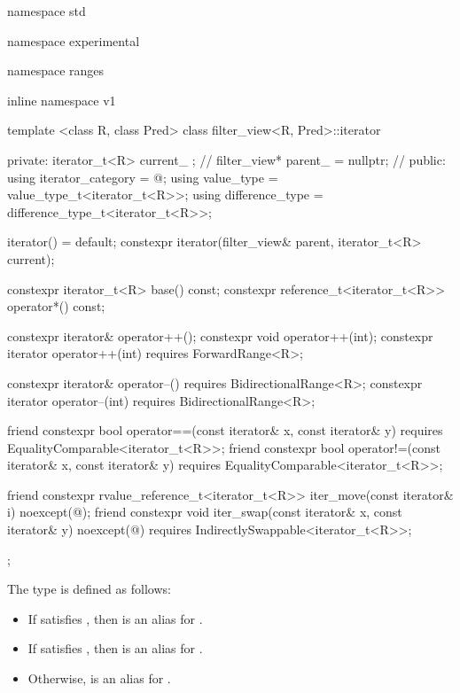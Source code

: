 %
\begin{codeblock}
namespace std { namespace experimental { namespace ranges { inline namespace v1 {
  template <class R, class Pred>
  class filter_view<R, Pred>::iterator {
  private:
    iterator_t<R> current_ {}; // \expos
    filter_view* parent_ = nullptr; // \expos
  public:
    using iterator_category = @\seebelow@;
    using value_type = value_type_t<iterator_t<R>>;
    using difference_type = difference_type_t<iterator_t<R>>;

    iterator() = default;
    constexpr iterator(filter_view& parent, iterator_t<R> current);

    constexpr iterator_t<R> base() const;
    constexpr reference_t<iterator_t<R>> operator*() const;

    constexpr iterator& operator++();
    constexpr void operator++(int);
    constexpr iterator operator++(int) requires ForwardRange<R>;

    constexpr iterator& operator--() requires BidirectionalRange<R>;
    constexpr iterator operator--(int) requires BidirectionalRange<R>;

    friend constexpr bool operator==(const iterator& x, const iterator& y)
      requires EqualityComparable<iterator_t<R>>;
    friend constexpr bool operator!=(const iterator& x, const iterator& y)
      requires EqualityComparable<iterator_t<R>>;

    friend constexpr rvalue_reference_t<iterator_t<R>> iter_move(const iterator& i)
      noexcept(@\seebelow@);
    friend constexpr void iter_swap(const iterator& x, const iterator& y)
      noexcept(@\seebelow@) requires IndirectlySwappable<iterator_t<R>>;
  };
}}}}
\end{codeblock}

\pnum
The type  is defined as follows:
\begin{itemize}
\item If  satisfies , then 
is an alias for .
\item If  satisfies , then 
is an alias for .
\item Otherwise,  is an alias for
.
\end{itemize}


